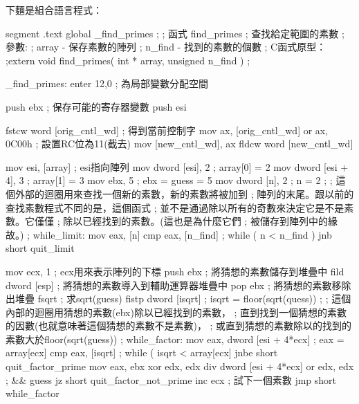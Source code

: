 {下麵是組合語言程式：


\begin{AsmCodeListing}[label=prime2.asm]
segment .text
        global  _find_primes
;
; 函式 find_primes
; 查找給定範圍的素數
; 參數:
;   array  - 保存素數的陣列
;   n_find - 找到的素數的個數
; C函式原型：
;extern void find_primes( int * array, unsigned n_find )
;

_find_primes:
        enter   12,0                    ; 為局部變數分配空間

        push    ebx                     ; 保存可能的寄存器變數
        push    esi

        fstcw   word [orig_cntl_wd]     ; 得到當前控制字
        mov     ax, [orig_cntl_wd]
        or      ax, 0C00h               ; 設置RC位為11(截去)
        mov     [new_cntl_wd], ax
        fldcw   word [new_cntl_wd]

        mov     esi, [array]            ; esi指向陣列
        mov     dword [esi], 2          ; array[0] = 2
        mov     dword [esi + 4], 3      ; array[1] = 3
        mov     ebx, 5                  ; ebx = guess = 5
        mov     dword [n], 2            ; n = 2
;
; 這個外部的迴圈用來查找一個新的素數，新的素數將被加到
; 陣列的末尾。跟以前的查找素數程式不同的是，這個函式
; 並不是通過除以所有的奇數來決定它是不是素數。它僅僅
; 除以已經找到的素數。(這也是為什麼它們
; 被儲存到陣列中的緣故。)
;
while_limit:
        mov     eax, [n]
        cmp     eax, [n_find]           ; while ( n < n_find )
        jnb     short quit_limit

        mov     ecx, 1                  ; ecx用來表示陣列的下標
        push    ebx                     ; 將猜想的素數儲存到堆疊中
        fild    dword [esp]             ; 將猜想的素數導入到輔助運算器堆疊中
        pop     ebx                     ; 將猜想的素數移除出堆疊
        fsqrt                           ; 求sqrt(guess)
        fistp   dword [isqrt]           ; isqrt = floor(sqrt(quess))
;
; 這個內部的迴圈用猜想的素數(ebx)除以已經找到的素數，
; 直到找到一個猜想的素數的因數(也就意味著這個猜想的素數不是素數)，
; 或直到猜想的素數除以的找到的素數大於floor(sqrt(guess))
;
while_factor:
        mov     eax, dword [esi + 4*ecx]        ; eax = array[ecx]
        cmp     eax, [isqrt]                    ; while ( isqrt < array[ecx]
        jnbe    short quit_factor_prime
        mov     eax, ebx
        xor     edx, edx
        div     dword [esi + 4*ecx]
        or      edx, edx                        ; && guess %
        jz      short quit_factor_not_prime
        inc     ecx                             ; 試下一個素數
        jmp     short while_factor


\end{AsmCodeListing}}

